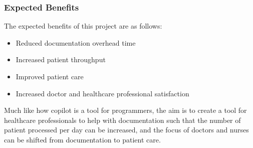 \documentclass[12pt]{article}
\begin{document}
\subsubsection{Expected Benefits}
The expected benefits of this project are as follows:
\begin{itemize}
  \item Reduced documentation overhead time
  \item Increased patient throughput
  \item Improved patient care
  \item Increased doctor and healthcare professional satisfaction
\end{itemize}

Much like how copilot is a tool for programmers, the aim is to create a tool for healthcare professionals to help with documentation such that the number of patient processed per day can be increased, and the focus of doctors and nurses can be shifted from documentation to patient care. 
\end{document}
